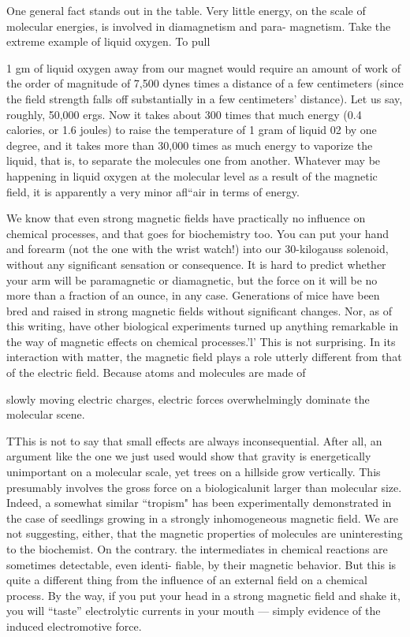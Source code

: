{One general fact stands out in the table. Very little energy, on the
scale of molecular energies, is involved in diamagnetism and para-
magnetism. Take the extreme example of liquid oxygen. To pull

1 gm of liquid oxygen away from our magnet would require an
amount of work of the order of magnitude of 7,500 dynes times a
distance of a few centimeters (since the field strength falls off substantially
in a few centimeters' distance). Let us say, roughly,
50,000 ergs. Now it takes about 300 times that much energy (0.4
calories, or 1.6 joules) to raise the temperature of 1 gram of liquid 02
by one degree, and it takes more than 30,000 times as much energy
to vaporize the liquid, that is, to separate the molecules one from
another. Whatever may be happening in liquid oxygen at the molecular
level as a result of the magnetic field, it is apparently a very minor
afl``air in terms of energy.

We know that even strong magnetic fields have practically no
influence on chemical processes, and that goes for biochemistry too.
You can put your hand and forearm (not the one with the wrist
watch!) into our 30-kilogauss solenoid, without any significant
sensation or consequence. It is hard to predict whether your arm
will be paramagnetic or diamagnetic, but the force on it will be no
more than a fraction of an ounce, in any case. Generations of mice
have been bred and raised in strong magnetic fields without significant
changes. Nor, as of this writing, have other biological experiments
turned up anything remarkable in the way of magnetic effects
on chemical processes.'l' This is not surprising. In its interaction
with matter, the magnetic field plays a role utterly different from that
of the electric field. Because atoms and molecules are made of

slowly moving electric charges, electric forces overwhelmingly
dominate the molecular scene.

TThis is not to say that small effects are always inconsequential. After all, an argument
like the one we just used would show that gravity is energetically unimportant
on a molecular scale, yet trees on a hillside grow vertically. This presumably involves
the gross force on a biologicalunit larger than molecular size. Indeed, a somewhat
similar ``tropism" has been experimentally demonstrated in the case of seedlings growing
in a strongly inhomogeneous magnetic field. We are not suggesting, either, that
the magnetic properties of molecules are uninteresting to the biochemist. On the
contrary. the intermediates in chemical reactions are sometimes detectable, even identi-
fiable, by their magnetic behavior. But this is quite a different thing from the influence
of an external field on a chemical process. By the way, if you put your head in a
strong magnetic field and shake it, you will ``taste'' electrolytic currents in your mouth
 --- simply evidence of the induced electromotive force.

}
